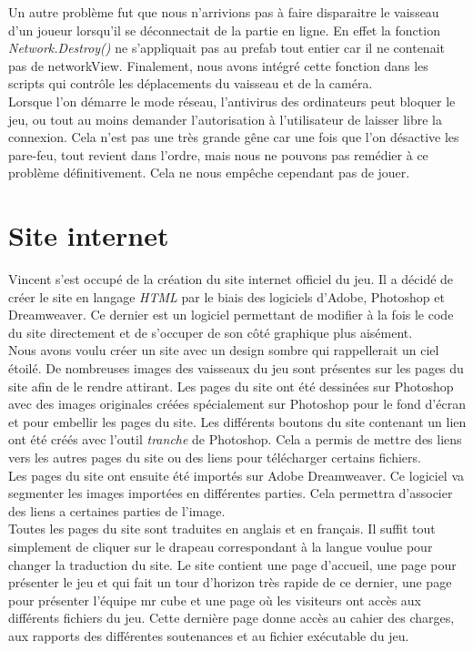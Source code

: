 \documentclass[12pt, titlepage]{article}
\begin{document}
\begin{spacing}{1.5}
Un autre problème fut que nous n'arrivions pas à faire disparaitre le vaisseau d'un joueur lorsqu'il se déconnectait de la partie en ligne. En effet la fonction \textit{Network.Destroy()} ne s'appliquait pas au prefab tout entier car il ne contenait pas de networkView. Finalement, nous avons intégré cette fonction dans les scripts qui contrôle les déplacements du vaisseau et de la caméra.\\

Lorsque l'on démarre le mode réseau, l'antivirus des ordinateurs peut bloquer le jeu, ou tout au moins demander l'autorisation à l'utilisateur de laisser libre la connexion. Cela n'est pas une très grande gêne car une fois que l'on désactive les pare-feu, tout revient dans l'ordre, mais nous ne pouvons pas remédier à ce problème définitivement. Cela ne nous empêche cependant pas de jouer.\\

\newpage
\section{Site internet}

Vincent s'est occupé de la création du site internet officiel du jeu. Il a décidé de créer le site en langage \textit{HTML} par le biais des logiciels d'Adobe, Photoshop et Dreamweaver. Ce dernier est un logiciel permettant de modifier à la fois le code du site directement et de s'occuper de son côté graphique plus aisément.\\

Nous avons voulu créer un site avec un design sombre qui rappellerait un ciel étoilé. De nombreuses images des vaisseaux du jeu sont présentes sur les pages du site afin de le rendre attirant. Les pages du site ont été dessinées sur Photoshop avec des images originales créées spécialement sur Photoshop pour le fond d'écran et pour embellir les pages du site. Les différents boutons du site contenant un lien ont été créés avec l’outil \textit{tranche} de Photoshop. Cela a permis de mettre des liens vers les autres pages du site ou des liens pour télécharger certains fichiers.\\

Les pages du site ont ensuite été importés sur  Adobe Dreamweaver. Ce logiciel va segmenter les images importées en différentes parties. Cela permettra d’associer des liens a certaines parties de l’image.\\ 

Toutes les pages du site sont traduites en anglais et en français. Il suffit tout simplement de cliquer sur le drapeau correspondant à la langue voulue pour changer la traduction du site. Le site contient une page d'accueil, une page pour présenter le jeu et qui fait un tour d’horizon très rapide de ce dernier, une page pour présenter l'équipe mr cube et une page où les visiteurs ont accès aux différents fichiers du jeu. Cette dernière page donne accès au cahier des charges, aux rapports des différentes soutenances et au fichier exécutable du jeu.\\


\end{spacing}
\end{document}
